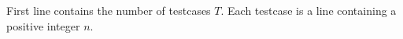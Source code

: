 First line contains the number of testcases $T$.
Each testcase is a line containing a positive integer $n$.

